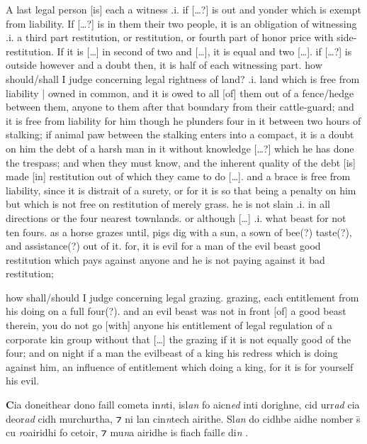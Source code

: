 \documentclass[11pt]{article}
\begin{document}
\begin{pages}
  \begin{Rightside}
    \beginnumbering
   \pstart
   A last legal person [is] each a witness .i. if [\ldots{}?] is out and yonder which is exempt from liability.  If [\ldots{}?] is in them their two people, it is an obligation of witnessing .i. a third part restitution, or restitution, or fourth part of honor price with side-restitution.  If it is [\ldots{}] in second of two and [\ldots{}], it is equal and two [\ldots{}]. if [\ldots{}?] is outside however and a doubt then, it is half of each witnessing part.  how should/shall I judge concerning legal rightness of land? .i. land which is free from liability | owned in common, and it is owed to all [of] them out of a fence/hedge between them, anyone to them after that boundary from their cattle-guard; and it is free from liability for him though he plunders four in it between two hours of stalking; if animal paw between the stalking enters into a compact, it is a doubt on him the debt of a harsh man in it without knowledge [\ldots{}?] which he has done the trespass; and when they must know, and the inherent quality of the debt [is] made [in] restitution out of which they came to do [\ldots{}]. and a brace is free from liability, since it is distrait of a surety, or for it is so that being a penalty on him but which is not free on restitution of merely grass.  he is not slain .i. in all directions or the four nearest townlands. or although [\ldots{}] .i. what beast for not ten fours. as a horse grazes until, pigs dig with a sun, a sown of bee(?) taste(?), and assistance(?) out of it. for, it is evil for a man of the evil beast good restitution which pays against anyone and he is not paying against it bad restitution; 
    \pend
  
    \pstart
    how shall/should I judge concerning legal grazing. grazing, each entitlement from his doing on a full four(?). and an evil beast was not in front [of] a good beast therein, you do not go [with] anyone his entitlement of legal regulation of a corporate kin group without that [\ldots{}] the grazing if it is not equally good of the four; and on night if a man the evilbeast of a king his redress which is doing against him, an influence of entitlement which doing a king, for it is for yourself his evil. 
    \pend
    \endnumbering
  \end{Rightside}
  \Pages

  \begin{Leftside}
    \beginnumbering
    \pstart
    \textbf{C}ia doneithear dono faill cometa in\emph{n}ti, isl\emph{an} fo aicn\emph{ed} inti dorighne, cid urr\emph{ad} cia deor\emph{ad} cidh murchurtha, ⁊ ni lan cin\emph{n}tech airithe.  Sl\emph{an} do cidhbe aidhe nomber \={s} cu \emph{r}oairidhi fo cetoir, ⁊ mu\emph{n}a airidhe is fiach faill\emph{e} di\emph{n} .
    \pend


\end{Leftside}
\end{pages}
\end{document}
